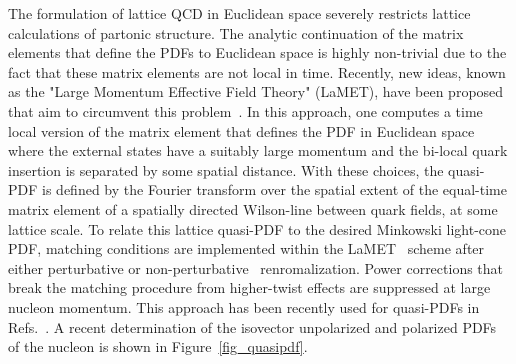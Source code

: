 The formulation of lattice QCD in Euclidean space severely restricts
lattice calculations of partonic structure.  
The analytic continuation of the matrix elements that define the PDFs to Euclidean space is highly non-trivial due to the fact that these matrix elements are not local in time. Recently, new ideas,  known as the "Large Momentum Effective Field Theory" (LaMET),  have
been proposed that aim to circumvent this problem~\cite{Ji:2013dva,Ji:2014gla}.
In this approach, one computes a time local version of the matrix element that defines the PDF in Euclidean space
where the external states have a suitably large momentum  and the
bi-local quark insertion is separated by some spatial distance.
%
With these choices, the quasi-PDF is defined by the Fourier transform over the spatial extent of the equal-time matrix element of a spatially directed Wilson-line between quark fields, at some lattice scale. To relate this lattice quasi-PDF to the desired Minkowski light-cone PDF, matching conditions are implemented within the LaMET~\cite{Ji:2013dva,Ji:2014gla} scheme after either perturbative or non-perturbative~\cite{Martinelli:1994ty} renromalization. Power corrections that break the matching  procedure from  higher-twist effects are suppressed at large nucleon momentum. This approach has been recently used  for quasi-PDFs  in Refs.~\cite{Alexandrou:2017huk,Chen:2017mzz,Green:2017xeu,Chen:2018xof,Lin:2018qky}. A recent determination of the isovector unpolarized and polarized PDFs of the  nucleon is shown in Figure~\ref{fig_quasipdf}.


